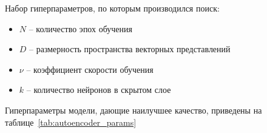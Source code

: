 \pagebreak
Набор гиперпараметров, по которым производился поиск:
\begin{itemize}
    \item $N$ -- количество эпох обучения
    \item $D$ -- размерность пространства векторных представлений
    \item $\nu$ -- коэффициент скорости обучения
    \item $k$ -- количество нейронов в скрытом слое
\end{itemize}

Гиперпараметры модели, дающие наилучшее качество, приведены на таблице~\ref{tab:autoencoder_params}
\begin{table}[h]
    \caption{Гиперпараметры автоэнкодера}
    \label{tab:autoencoder_params}
\end{table}



